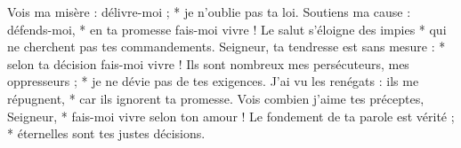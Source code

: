 Vois ma misère : délivre-moi ; *
je n’oublie pas ta loi.
\versseparator
Soutiens ma cause : défends-moi, *
en ta promesse fais-moi vivre !
\versseparator
Le salut s’éloigne des impies *
qui ne cherchent pas tes commandements.
\versseparator
Seigneur, ta tendresse est sans mesure : *
selon ta décision fais-moi vivre !
\versseparator
Ils sont nombreux mes persécuteurs, mes oppresseurs ; *
je ne dévie pas de tes exigences.
\versseparator
J’ai vu les renégats : ils me répugnent, *
car ils ignorent ta promesse.
\versseparator
Vois combien j’aime tes préceptes, Seigneur, *
fais-moi vivre selon ton amour !
\versseparator
Le fondement de ta parole est vérité ; *
éternelles sont tes justes décisions.
